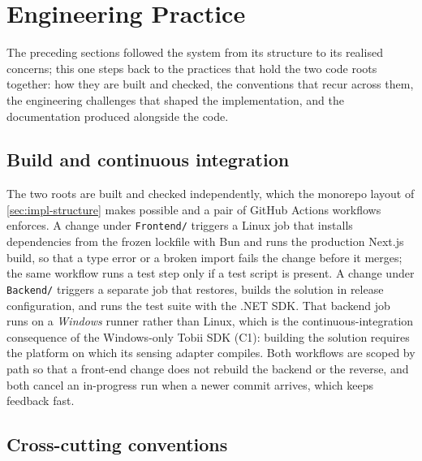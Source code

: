 \section{Engineering Practice}
\label{sec:impl-engineering}

The preceding sections followed the system from its structure to its realised concerns; this one steps back to the practices that hold the two code roots together: how they are built and checked, the conventions that recur across them, the engineering challenges that shaped the implementation, and the documentation produced alongside the code.

\subsection{Build and continuous integration}
\label{subsec:impl-ci}

The two roots are built and checked independently, which the monorepo layout of \cref{sec:impl-structure} makes possible and a pair of GitHub Actions workflows enforces.
A change under \texttt{Frontend/} triggers a Linux job that installs dependencies from the frozen lockfile with Bun and runs the production Next.js build, so that a type error or a broken import fails the change before it merges; the same workflow runs a test step only if a test script is present.
A change under \texttt{Backend/} triggers a separate job that restores, builds the solution in release configuration, and runs the test suite with the .NET SDK.
That backend job runs on a \emph{Windows} runner rather than Linux, which is the continuous-integration consequence of the Windows-only Tobii SDK (C1): building the solution requires the platform on which its sensing adapter compiles.
Both workflows are scoped by path so that a front-end change does not rebuild the backend or the reverse, and both cancel an in-progress run when a newer commit arrives, which keeps feedback fast.

\subsection{Cross-cutting conventions}
\label{subsec:impl-conventions}

